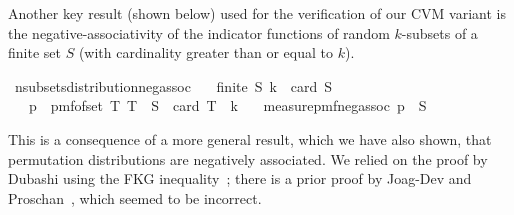 Another key result (shown below) used for the verification of our CVM variant is the negative-associativity of the indicator functions of random $k$-subsets of a finite set $S$ (with cardinality greater than or equal to $k$).
\begin{isabelle_cm}
\isamarkupfalse%
\ n{\isacharunderscore}{\kern0pt}subsets{\isacharunderscore}{\kern0pt}distribution{\isacharunderscore}{\kern0pt}neg{\isacharunderscore}{\kern0pt}assoc{\isacharcolon}{\kern0pt}\isanewline
\ \ \ {\isacartoucheopen}finite\ S{\isacartoucheclose}\ {\isacartoucheopen}k\ {\isasymle}\ card\ S{\isacartoucheclose}\isanewline
\ \ \ {\isacartoucheopen}p\ {\isasymequiv}\ pmf{\isacharunderscore}{\kern0pt}of{\isacharunderscore}{\kern0pt}set\ {\isacharbraceleft}{\kern0pt}T{\isachardot}{\kern0pt}\ T\ {\isasymsubseteq}\ S\ {\isasymand}\ card\ T\ {\isacharequal}{\kern0pt}\ k{\isacharbraceright}{\kern0pt}{\isacartoucheclose}\isanewline
\ \ \ {\isacartoucheopen}measure{\isacharunderscore}{\kern0pt}pmf{\isachardot}{\kern0pt}neg{\isacharunderscore}{\kern0pt}assoc\ p\ {\isacharparenleft}{\kern0pt}{\isasymin}{\isacharparenright}{\kern0pt}\ S{\isacartoucheclose}
\end{isabelle_cm}
This is a consequence of a more general result, which we have also shown, that permutation distributions are negatively associated.
We relied on the proof by Dubashi using the FKG inequality~\cite[Th. 10]{dubhashi1996}; there is a prior proof by Joag-Dev and Proschan~\cite[Th. 2.11]{joagdev1983}, which seemed to be incorrect.
